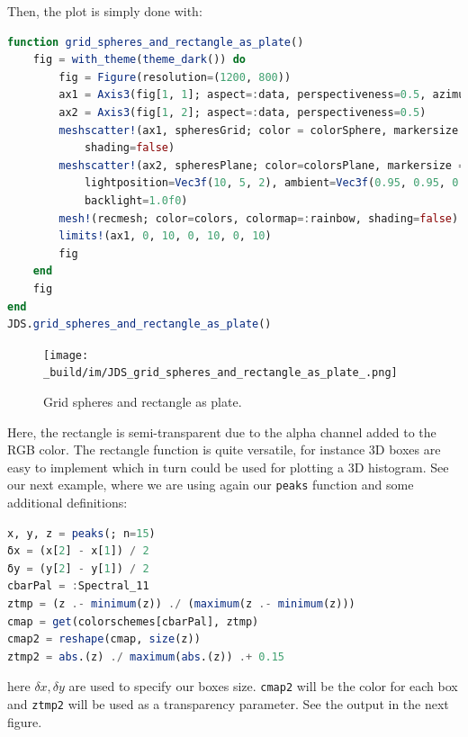 \documentclass[
  notoc %
]{tufte-book}
\newcommand{\passthrough}[1]{#1}
\begin{document}
Then, the plot is simply done with:

\begin{lstlisting}[language=Julia]
function grid_spheres_and_rectangle_as_plate()
    fig = with_theme(theme_dark()) do
        fig = Figure(resolution=(1200, 800))
        ax1 = Axis3(fig[1, 1]; aspect=:data, perspectiveness=0.5, azimuth=0.72)
        ax2 = Axis3(fig[1, 2]; aspect=:data, perspectiveness=0.5)
        meshscatter!(ax1, spheresGrid; color = colorSphere, markersize = 1,
            shading=false)
        meshscatter!(ax2, spheresPlane; color=colorsPlane, markersize = 0.75,
            lightposition=Vec3f(10, 5, 2), ambient=Vec3f(0.95, 0.95, 0.95),
            backlight=1.0f0)
        mesh!(recmesh; color=colors, colormap=:rainbow, shading=false)
        limits!(ax1, 0, 10, 0, 10, 0, 10)
        fig
    end
    fig
end
JDS.grid_spheres_and_rectangle_as_plate()
\end{lstlisting}

\begin{figure}
\hypertarget{fig:grid_spheres_and_rectangle_as_plate}{%
\centering
\texttt{[image: \_build/im/JDS\_grid\_spheres\_and\_rectangle\_as\_plate\_.png]}
\caption{Grid spheres and rectangle as
plate.}\label{fig:grid_spheres_and_rectangle_as_plate}
}
\end{figure}

Here, the rectangle is semi-transparent due to the alpha channel added
to the RGB color. The rectangle function is quite versatile, for
instance 3D boxes are easy to implement which in turn could be used for
plotting a 3D histogram. See our next example, where we are using again
our \passthrough{\lstinline!peaks!} function and some additional
definitions:

\begin{lstlisting}[language=Julia]
x, y, z = peaks(; n=15)
δx = (x[2] - x[1]) / 2
δy = (y[2] - y[1]) / 2
cbarPal = :Spectral_11
ztmp = (z .- minimum(z)) ./ (maximum(z .- minimum(z)))
cmap = get(colorschemes[cbarPal], ztmp)
cmap2 = reshape(cmap, size(z))
ztmp2 = abs.(z) ./ maximum(abs.(z)) .+ 0.15
\end{lstlisting}

here \(\delta x, \delta y\) are used to specify our boxes size.
\passthrough{\lstinline!cmap2!} will be the color for each box and
\passthrough{\lstinline!ztmp2!} will be used as a transparency
parameter. See the output in the next figure.
\end{document}
